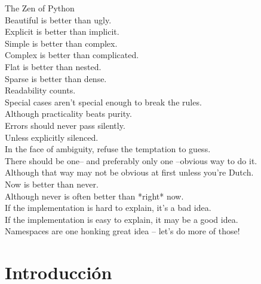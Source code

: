 \documentclass[12pt]{article} %
\begin{document}
\tableofcontents %

\newpage %


\large The Zen of Python\\
\small{Beautiful is better than ugly.\\
    Explicit is better than implicit.\\
    Simple is better than complex.\\
    Complex is better than complicated.\\
    Flat is better than nested.\\
    Sparse is better than dense.\\
    Readability counts.\\
    Special cases aren't special enough to break the rules.\\
    Although practicality beats purity.\\
    Errors should never pass silently.\\
    Unless explicitly silenced.\\
    In the face of ambiguity, refuse the temptation to guess.\\
    There should be one-- and preferably only one --obvious way to do it.\\
    Although that way may not be obvious at first unless you're Dutch.\\
    Now is better than never.\\
    Although never is often better than *right* now.\\
    If the implementation is hard to explain, it's a bad idea.\\
    If the implementation is easy to explain, it may be a good idea.\\
    Namespaces are one honking great idea -- let's do more of those!\\} 

\section{Introducción} %
\end{document}
